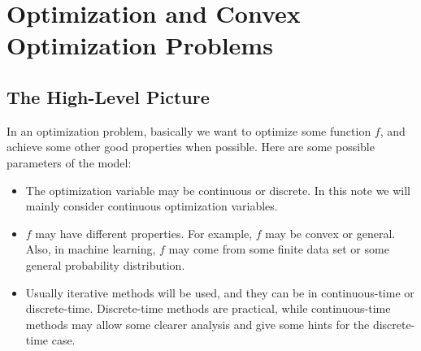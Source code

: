 \documentclass[openany]{book}
\newtheorem{theorem}{Theorem}[chapter]
\theoremstyle{definition}
\theoremstyle{remark}
\begin{document}
\begin{comment}
\paragraph{Remark}
One application is that suppose $f$ is twice differentiable, then $f$ is supermodular on $\mathbb{R}^n$ iff the off-diagonal entries of its Hessian is non-negative everywhere.

\begin{theorem}[\cite{T11} Theorem 2.6.4]
    Suppose for any $i\in[n]$, $P_i$ is a chain. Then $f$ is separable on $\prod_{i\in I}P_i$ iff $f$ is modular on $\prod_{i\in I}P_i$.
\end{theorem}

\section{Basic Properties}
\begin{theorem}[\cite{T11} Theorem 2.7.1 and Theorem 2.7.5]
    If $f$ is (strictly) supermodular on a lattice $P$, then $\arg\max_{x\in P}f(x)$ is a sublattice (chain) of $P$.
\end{theorem}
\begin{theorem}[\cite{T11} Theorem 2.7.6 and Theorem 2.7.7]
    Suppose $P$ and $Q$ are two lattices, $L$ is a sublattice of $P\times Q$, and $f$ is a (strictly) supermodular function on $L$. For each $q\in \Pi_QL$, assume $g(q)=\sup_{p\in S_q}f(p,q)$ ($\max_{p\in S_q}f(p,q)$) exists and is finite. Then $g$ is (strictly) supermodular on $\Pi_QL$.
\end{theorem}
\end{comment}

\chapter{Optimization and Convex Optimization Problems}
\section{The High-Level Picture}
In an optimization problem, basically we want to optimize some function $f$, and achieve some other good properties when possible. Here are some possible parameters of the model:
\begin{itemize}
    \item The optimization variable may be continuous or discrete. In this note we will mainly consider continuous optimization variables.
    \item $f$ may have different properties. For example, $f$ may be convex or general. Also, in machine learning, $f$ may come from some finite data set or some general probability distribution.
    \item Usually iterative methods will be used, and they can be in continuous-time or discrete-time. Discrete-time methods are practical, while continuous-time methods may allow some clearer analysis and give some hints for the discrete-time case.
\end{itemize}
\end{document}
